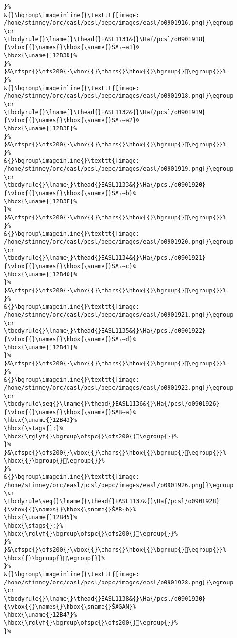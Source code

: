 \begin{verbatim}
}%
&{}\bgroup\imageinline{}\texttt{[image: /home/stinney/orc/easl/pcsl/pepc/images/easl/o0901916.png]}\egroup
\cr
\tbodyrule{}\lname{}\thead{}EASL1131&{}\Ha{/pcsl/o0901918}{\vbox{{}\names{}\hbox{\sname{}ŠA₃∼a1}%
\hbox{\uname{}12B3D}%
}%
}&\ofspc{}\ofs200{}\vbox{{}\chars{}\hbox{{}\bgroup{}𒬽\egroup{}}%
}%
&{}\bgroup\imageinline{}\texttt{[image: /home/stinney/orc/easl/pcsl/pepc/images/easl/o0901918.png]}\egroup
\cr
\tbodyrule{}\lname{}\thead{}EASL1132&{}\Ha{/pcsl/o0901919}{\vbox{{}\names{}\hbox{\sname{}ŠA₃∼a2}%
\hbox{\uname{}12B3E}%
}%
}&\ofspc{}\ofs200{}\vbox{{}\chars{}\hbox{{}\bgroup{}𒬾\egroup{}}%
}%
&{}\bgroup\imageinline{}\texttt{[image: /home/stinney/orc/easl/pcsl/pepc/images/easl/o0901919.png]}\egroup
\cr
\tbodyrule{}\lname{}\thead{}EASL1133&{}\Ha{/pcsl/o0901920}{\vbox{{}\names{}\hbox{\sname{}ŠA₃∼b}%
\hbox{\uname{}12B3F}%
}%
}&\ofspc{}\ofs200{}\vbox{{}\chars{}\hbox{{}\bgroup{}𒬿\egroup{}}%
}%
&{}\bgroup\imageinline{}\texttt{[image: /home/stinney/orc/easl/pcsl/pepc/images/easl/o0901920.png]}\egroup
\cr
\tbodyrule{}\lname{}\thead{}EASL1134&{}\Ha{/pcsl/o0901921}{\vbox{{}\names{}\hbox{\sname{}ŠA₃∼c}%
\hbox{\uname{}12B40}%
}%
}&\ofspc{}\ofs200{}\vbox{{}\chars{}\hbox{{}\bgroup{}𒭀\egroup{}}%
}%
&{}\bgroup\imageinline{}\texttt{[image: /home/stinney/orc/easl/pcsl/pepc/images/easl/o0901921.png]}\egroup
\cr
\tbodyrule{}\lname{}\thead{}EASL1135&{}\Ha{/pcsl/o0901922}{\vbox{{}\names{}\hbox{\sname{}ŠA₃∼d}%
\hbox{\uname{}12B41}%
}%
}&\ofspc{}\ofs200{}\vbox{{}\chars{}\hbox{{}\bgroup{}𒭁\egroup{}}%
}%
&{}\bgroup\imageinline{}\texttt{[image: /home/stinney/orc/easl/pcsl/pepc/images/easl/o0901922.png]}\egroup
\cr
\tbodyrule\seq{}\lname{}\thead{}EASL1136&{}\Ha{/pcsl/o0901926}{\vbox{{}\names{}\hbox{\sname{}ŠAB∼a}%
\hbox{\uname{}12B43}%
\hbox{\stags{}:}%
\hbox{\rglyf{}\bgroup\ofspc{}\ofs200{}𒭃\egroup{}}%
}%
}&\ofspc{}\ofs200{}\vbox{{}\chars{}\hbox{{}\bgroup{}𒭂\egroup{}}%
\hbox{{}\bgroup{}𒭃\egroup{}}%
}%
&{}\bgroup\imageinline{}\texttt{[image: /home/stinney/orc/easl/pcsl/pepc/images/easl/o0901926.png]}\egroup
\cr
\tbodyrule\seq{}\lname{}\thead{}EASL1137&{}\Ha{/pcsl/o0901928}{\vbox{{}\names{}\hbox{\sname{}ŠAB∼b}%
\hbox{\uname{}12B45}%
\hbox{\stags{}:}%
\hbox{\rglyf{}\bgroup\ofspc{}\ofs200{}𒭅\egroup{}}%
}%
}&\ofspc{}\ofs200{}\vbox{{}\chars{}\hbox{{}\bgroup{}𒭄\egroup{}}%
\hbox{{}\bgroup{}𒭅\egroup{}}%
}%
&{}\bgroup\imageinline{}\texttt{[image: /home/stinney/orc/easl/pcsl/pepc/images/easl/o0901928.png]}\egroup
\cr
\tbodyrule{}\lname{}\thead{}EASL1138&{}\Ha{/pcsl/o0901930}{\vbox{{}\names{}\hbox{\sname{}ŠAGAN}%
\hbox{\uname{}12B47}%
\hbox{\rglyf{}\bgroup\ofspc{}\ofs200{}𒭇\egroup{}}%
}%

\end{verbatim}
